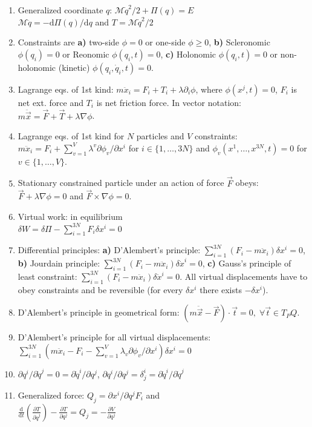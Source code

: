 \documentclass{article}
\renewcommand\d{\mathrm d}
\begin{document}
\begin{multicols}{3}
\begin{enumerate}
            \item Generalized coordinate $q$: $\mathcal M\dot{q}^2/2+\Pi(q)=E$\\ $\mathcal M\ddot q =-\d\Pi(q)/\d q$ and $T =\mathcal M\dot{q}^2/2$
            \item Constraints are \textbf{a)} two-side $\phi=0$ or one-side $\phi\geq 0$, \textbf{b)} Scleronomic $\phi(q_i)=0$ or Reonomic $\phi(q_i,t)=0$, \textbf{c)} Holonomic $\phi(q_i,t)=0$ or non-holonomic (kinetic) $\phi(q_i,\dot q_i,t)=0$.
            \item Lagrange eqs. of 1st kind: $m\ddot x_i=F_i+T_i+\lambda\partial_i\phi$, where $\phi(x^j,t)=0$, $F_i$ is net ext. force and $T_i$ is net friction force. In vector notation:\\ $m\ddot{\vec x}=\vec F+\vec T+\lambda\nabla\phi$.
            \item Lagrange eqs. of 1st kind for $N$ particles and $V$ constraints: $m\ddot x_i=F_i+\sum_{v=1}^V\lambda^v\partial\phi_v/\partial x^i$ for $i\in\{1,\ldots, 3N\}$ and  $\phi_v(x^1,\ldots,x^{3N},t)=0$ for $v\in\{1,\ldots, V\}$.
            \item Stationary constrained particle under an action of force $\vec F$ obeys: $\vec F+\lambda\nabla\phi=0$ and $\vec F\times\nabla\phi=0$.
            \item Virtual work: in equilibrium\\ $\delta W=\delta \Pi-\sum_{i=1}^{3N}F_i\delta x^i =0$
            \item Differential principles: \textbf{a)} D'Alembert's principle: $\sum_{i=1}^{3N}(F_i-m\ddot x_i)\delta x^i=0$, \textbf{b)} Jourdain principle: $\sum_{i=1}^{3N}(F_i-m\ddot x_i)\delta\dot x^i=0$, \textbf{c)} Gauss's principle of least constraint: $\sum_{i=1}^{3N}(F_i-m\ddot x_i)\delta \ddot x^i=0$. All virtual displacements have to obey constraints and be reversible (for every $\delta x^i$ there exists $-\delta x^i$).
            \item D'Alembert's principle in geometrical form: $(m\ddot{\vec x}-\vec F)\cdot\vec t=0,\;\forall\vec t\in T_PQ$.
            \item D'Alembert's principle for all virtual displacements: $\sum_{i=1}^{3N}(m\ddot x_i-F_i-\sum_{v=1}^V\lambda_v\partial\phi_v/\partial x^i)\delta x^i=0$
            \item $\partial q^i/\partial\dot q^j=0=\partial\dot q^i/\partial q^j$, $\partial q^i/\partial q^j=\delta_j^i=\partial\dot q^i/\partial\dot q^j$
            \item Generalized force: $Q_j=\partial x^i/\partial q^jF_i$ and \\ $\frac{\d}{\d t}\left(\frac{\partial T}{\partial\dot q^j}\right)-\frac{\partial T}{\partial q^j}=Q_j=-\frac{\partial V}{\partial q^j}$

\end{enumerate}
\end{multicols}
\end{document}
